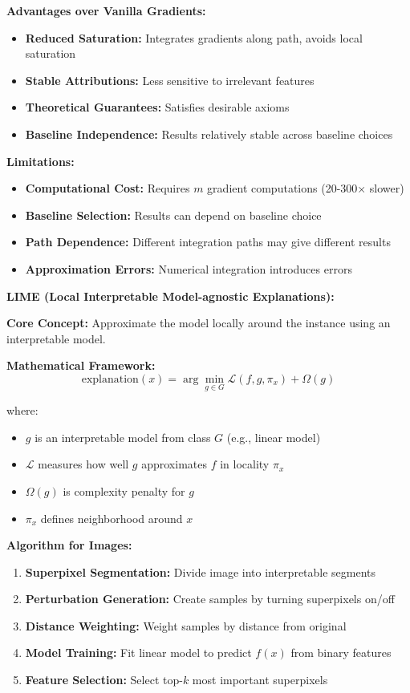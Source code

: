 \documentclass[12pt]{article}
\begin{document}
\begin{enumerate}[(a)]
{    \textbf{Advantages over Vanilla Gradients:}
    \begin{itemize}
        \item \textbf{Reduced Saturation:} Integrates gradients along path, avoids local saturation
        \item \textbf{Stable Attributions:} Less sensitive to irrelevant features
        \item \textbf{Theoretical Guarantees:} Satisfies desirable axioms
        \item \textbf{Baseline Independence:} Results relatively stable across baseline choices
    \end{itemize}
    
    \textbf{Limitations:}
    \begin{itemize}
        \item \textbf{Computational Cost:} Requires $m$ gradient computations (20-300× slower)
        \item \textbf{Baseline Selection:} Results can depend on baseline choice
        \item \textbf{Path Dependence:} Different integration paths may give different results
        \item \textbf{Approximation Errors:} Numerical integration introduces errors
    \end{itemize}
    
    \textbf{LIME (Local Interpretable Model-agnostic Explanations):}
    
    \textbf{Core Concept:} Approximate the model locally around the instance using an interpretable model.
    
    \textbf{Mathematical Framework:}
    $$\text{explanation}(x) = \arg\min_{g \in G} \mathcal{L}(f, g, \pi_x) + \Omega(g)$$
    
    where:
    \begin{itemize}
        \item $g$ is an interpretable model from class $G$ (e.g., linear model)
        \item $\mathcal{L}$ measures how well $g$ approximates $f$ in locality $\pi_x$
        \item $\Omega(g)$ is complexity penalty for $g$
        \item $\pi_x$ defines neighborhood around $x$
    \end{itemize}
    
    \textbf{Algorithm for Images:}
    \begin{enumerate}
        \item \textbf{Superpixel Segmentation:} Divide image into interpretable segments
        \item \textbf{Perturbation Generation:} Create samples by turning superpixels on/off
        \item \textbf{Distance Weighting:} Weight samples by distance from original
        \item \textbf{Model Training:} Fit linear model to predict $f(x)$ from binary features
        \item \textbf{Feature Selection:} Select top-$k$ most important superpixels
    \end{enumerate}
    
}
\end{enumerate}
\end{document}
